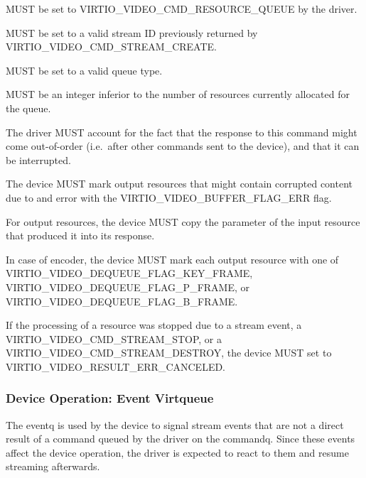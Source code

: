 
 MUST be set to VIRTIO\_VIDEO\_CMD\_RESOURCE\_QUEUE by
the driver.

 MUST be set to a valid stream ID previously returned
by VIRTIO\_VIDEO\_CMD\_STREAM\_CREATE.

 MUST be set to a valid queue type.

 MUST be an integer inferior to the number of
resources currently allocated for the queue.

The driver MUST account for the fact that the response to this command
might come out-of-order (i.e.~after other commands sent to the device),
and that it can be interrupted.


The device MUST mark output resources that might contain corrupted
content due to and error with the VIRTIO\_VIDEO\_BUFFER\_FLAG\_ERR flag.

For output resources, the device MUST copy the 
parameter of the input resource that produced it into its response.

In case of encoder, the device MUST mark each output resource with one
of VIRTIO\_VIDEO\_DEQUEUE\_FLAG\_KEY\_FRAME,
VIRTIO\_VIDEO\_DEQUEUE\_FLAG\_P\_FRAME, or
VIRTIO\_VIDEO\_DEQUEUE\_FLAG\_B\_FRAME.

If the processing of a resource was stopped due to a stream event, a
VIRTIO\_VIDEO\_CMD\_STREAM\_STOP, or a
VIRTIO\_VIDEO\_CMD\_STREAM\_DESTROY, the device MUST set 
to VIRTIO\_VIDEO\_RESULT\_ERR\_CANCELED.

\subsubsection{Device Operation: Event Virtqueue}\label{sec:Device Types / Video Device / Device Operation / Device Operation: Event Virtqueue}

The eventq is used by the device to signal stream events that are not a
direct result of a command queued by the driver on the commandq. Since
these events affect the device operation, the driver is expected to
react to them and resume streaming afterwards.

